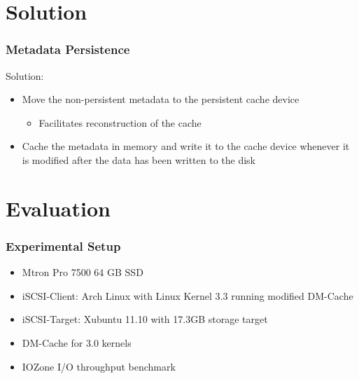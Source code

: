 \documentclass{beamer}
\begin{document}
\section{Solution}

\begin{frame}
  \frametitle{Metadata Persistence}

  Solution:
  \begin{itemize}
    \item Move the non-persistent metadata to the persistent cache
    device
    \begin{itemize}
      \item Facilitates reconstruction of the cache
    \end{itemize}
    \item Cache the metadata in memory and write it to the cache
    device whenever it is modified after the data has been written to
    the disk
  \end{itemize}

\end{frame}

\section{Evaluation}

\begin{frame}
  \frametitle{Experimental Setup}
    
  \begin{itemize}
    \item Mtron Pro 7500 64 GB SSD
    \item iSCSI-Client: Arch Linux with Linux Kernel 3.3 running
    modified DM-Cache
    \item iSCSI-Target: Xubuntu 11.10 with 17.3GB storage target
    \item DM-Cache for 3.0 kernels
    \item IOZone I/O throughput benchmark
  \end{itemize}

\end{frame}

\graphicspath{{../Results/}}
\end{document}

